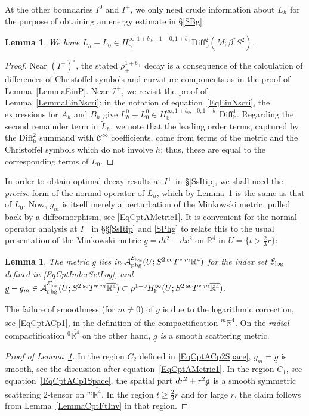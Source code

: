 \documentclass[reqno,11pt,letterpaper]{amsart}
\numberwithin{equation}{section}
\numberwithin{figure}{section}
\newtheorem{lemma}[thm]{Lemma}
\theoremstyle{definition}
\theoremstyle{remark}
\newcommand{\mc}{\mathcal}
\newcommand{\cA}{\mc A}
\newcommand{\cC}{\mc C}
\newcommand{\cE}{\mc E}
\newcommand{\ms}{\mathscr}
\newcommand{\scri}{\ms I}
\newcommand{\R}{\mathbb{R}}
\newcommand{\slg}{\slashed{g}{}}
\newcommand{\ol}{\overline}
\newcommand{\ul}[1]{\underline{#1}{}}
\newcommand{\wt}{\widetilde}
\newcommand{\bop}{{\mathrm{b}}}
\newcommand{\scl}{{\mathrm{sc}}}
\newcommand{\Diff}{\mathrm{Diff}}
\newcommand{\Diffb}{\Diff_\bop}
\newcommand{\Tsc}{{}^{\scl}T}
\newcommand{\CI}{\cC^\infty}
\newcommand{\Hb}{H_{\bop}}
\newcommand{\phg}{{\mathrm{phg}}}
\newcommand{\usref}[1]{{\upshape\ref{#1}}}
\begin{document}
At the other boundaries $I^0$ and $I^+$, we only need crude information about $L_h$ for the purpose of obtaining an energy estimate in \S\ref{SBg}:
\begin{lemma}
\label{LemmaEinNi0p}
  We have $L_h-L_0\in\Hb^{\infty;1+b_0,-1-0,1+b_+}\Diffb^2(M;\beta^*S^2)$.
\end{lemma}
\begin{proof}
  Near $(I^+)^\circ$, the stated $\rho_+^{1+b_+}$ decay is a consequence of the calculation of differences of Christoffel symbols and curvature components as in the proof of Lemma~\ref{LemmaEinP}. Near $\scri^+$, we revisit the proof of Lemma~\ref{LemmaEinNscri}: in the notation of equation~\eqref{EqEinNscri}, the expressions for $A_h$ and $B_h$ give $L_h^0-L_0^0\in\Hb^{\infty;1+b_0,-0,1+b_+}\Diffb^1$. Regarding the second remainder term in $\wt L_h$, we note that the leading order terms, captured by the $\Diffb^2$ summand with $\CI$ coefficients, come from terms of the metric and the Christoffel symbols which do not involve $h$; thus, these are equal to the corresponding terms of $L_0$.
\end{proof}

In order to obtain optimal decay results at $I^+$ in \S\ref{SsItip}, we shall need the \emph{precise} form of the normal operator of $L_h$, which by Lemma~\ref{LemmaEinNi0p} is the same as that of $L_0$. Now, $g_m$ is itself merely a perturbation of the Minkowski metric, pulled back by a diffeomorphism, see \eqref{EqCptAMetric1}. It is convenient for the normal operator analysis at $I^+$ in \S\S\ref{SsItip} and \ref{SPhg} to relate this to the usual presentation of the Minkowski metric $\ul g=dt^2-dx^2$ on $\R^4$ in $U=\{t>\tfrac23 r\}$:
\begin{lemma}
\label{LemmaEinNgmMink}
  The metric $\ul g$ lies in $\cA_\phg^{\cE_{\rm log}}(U;S^2\,\Tsc^*\,{}^m\ol{\R^4})$ for the index set $\cE_{\rm log}$ defined in \eqref{EqCptIndexSetLog}, and $\ul g-g_m\in\cA_\phg^{\cE'_{\rm log}}(U;S^2\,\Tsc^*\,{}^m\ol{\R^4})\subset\rho^{1-0}\Hb^\infty(U;S^2\,\Tsc^*\,{}^m\ol{\R^4})$.
\end{lemma}

The failure of smoothness (for $m\neq 0$) of $\ul g$ is due to the logarithmic correction, see \eqref{EqCptACp1}, in the definition of the compactification ${}^m\ol{\R^4}$. On the \emph{radial} compactification ${}^0\ol{\R^4}$ on the other hand, $\ul g$ \emph{is} a smooth scattering metric.

\begin{proof}[Proof of Lemma~\usref{LemmaEinNgmMink}]
  In the region $C_2$ defined in \eqref{EqCptACp2Space}, $g_m=\ul g$ is smooth, see the discussion after equation~\eqref{EqCptAMetric1}. In the region $C_1$, see equation~\eqref{EqCptACp1Space}, the spatial part $dr^2+r^2\slg$ is a smooth symmetric scattering 2-tensor on ${}^m\ol{\R^4}$. In the region $t\geq\tfrac23 r$ and for large $r$, the claim follows from Lemma~\ref{LemmaCptFtInv} in that region.
\end{proof}
\end{document}
